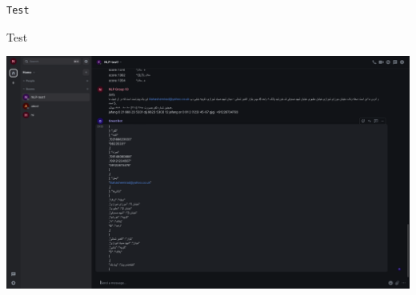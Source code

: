 \documentclass{solutionclass} %
\begin{document}
\begin{lstlisting}[language=Python]
	Test
\end{lstlisting}

\begin{solution}
	Test
\end{solution}

\begin{center}
  \includegraphics[scale = 0.3]{img/1.png}
\end{center}
\end{document}
